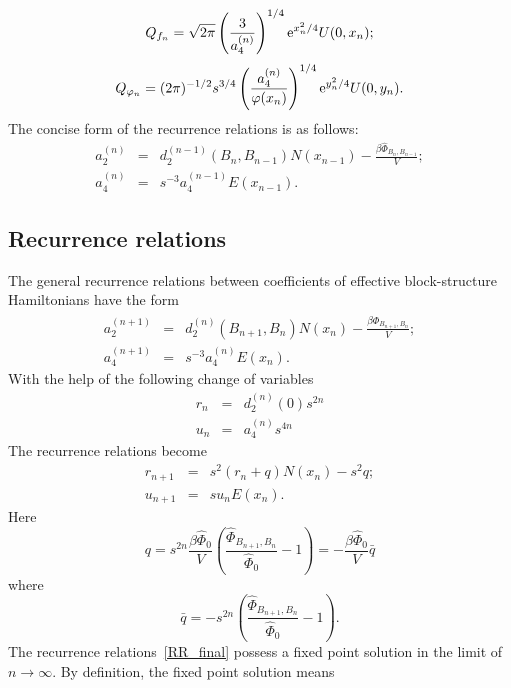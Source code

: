 \begin{equation*}
	Q_{f_n} = \sqrt{2\pi}\left(\frac{3}{a_4^{(n)}}\right)^{1/4} {\rm e}^{x_n^2/4} U(0,x_n);
\end{equation*}
\begin{equation*}
	Q_{\varphi_n} = (2\pi)^{-1/2} s^{3/4} \left(\frac{a_4^{(n)}}{\varphi(x_n)}\right)^{1/4} {\rm e}^{y_n^2/4} U(0,y_n).
\end{equation*}
The concise form of the recurrence relations is as follows:
\begin{eqnarray}
	a_2^{(n)} & = & d_2^{(n-1)}(B_n, B_{n-1}) N(x_{n-1}) - \frac{\beta\hat{\Phi}_{B_n, B_{n-1}}}{V};
	\\
	a_4^{(n)} & = & s^{-3} a_4^{(n-1)} E(x_{n-1}).
\end{eqnarray}

\subsection{Recurrence relations}
The general recurrence relations between coefficients of effective block-structure Hamiltonians have the form
\begin{eqnarray}
	a_2^{(n+1)} & = & d_2^{(n)}(B_{n+1}, B_n) N(x_n) - \frac{\beta\hat{\Phi}_{B_{n+1}, B_n}}{V};
	\\
	a_4^{(n+1)} & = & s^{-3} a_4^{(n)} E(x_{n}).
\end{eqnarray}
With the help of the following change of variables
\begin{eqnarray*}
	r_n & = & d_2^{(n)}(0)s^{2n}
	\nonumber \\
	u_n & = & a_4^{(n)}s^{4n}
	\nonumber
\end{eqnarray*}
The recurrence relations become
\begin{eqnarray}
	\label{RR_final}
	r_{n+1} & = & s^2(r_n + q) N(x_n) - s^2 q;
	\nonumber\\
	u_{n+1} & = & s u_n E(x_n).
\end{eqnarray}
Here
\begin{equation*}
	q = s^{2n} \frac{\beta \hat{\Phi}_0}{V} \left(\frac{\hat{\Phi}_{B_{n+1}, B_n}}{\hat{\Phi}_0} - 1\right) = -\frac{\beta \hat{\Phi}_0}{V} \bar{q}
\end{equation*}
where
\begin{equation}
	\bar{q} = -s^{2n} \left(\frac{\hat{\Phi}_{B_{n+1}, B_n}}{\hat{\Phi}_0} - 1\right).
\end{equation}
The recurrence relations~\eqref{RR_final} possess a fixed point solution in the limit of $n \to \infty$. By definition, the fixed point solution means
